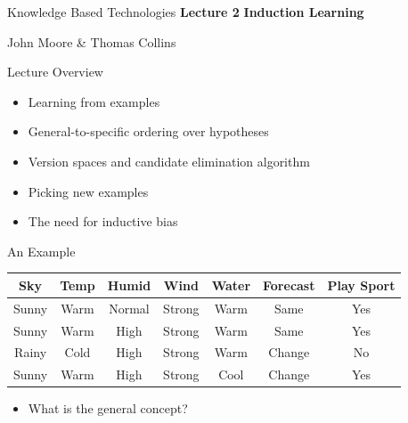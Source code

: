 \documentclass[%
pdf,
colorBG,
slideColor,
tcrico,
]{prosper}
\begin{document}
\begin{slide}{Knowledge Based Technologies}
\large
\textbf{Lecture 2} 
\newline
\textbf{Induction Learning}

\bigskip
\small
John Moore \& Thomas Collins



\end{slide}



\begin{slide}{Lecture Overview}
\begin{itemize}
\item Learning from examples
\item General-to-specific ordering over hypotheses
\item Version spaces and candidate elimination algorithm
\item Picking new examples
\item The need for inductive bias
\end{itemize}
\end{slide}



\begin{slide}{An Example}
	\begin{center}
	\tiny
	\begin{tabular}{ccccccc} \hline
	\rowcolor[HTML]{99aabb}\textbf{Sky} & \textbf{Temp} & \textbf{Humid} & \textbf{Wind} & \textbf{Water} & \textbf{Forecast}& \textbf{Play Sport}
	\\ \hline \hline
	\rowcolor[HTML]{bbccdd} Sunny   & Warm    & Normal & Strong  & Warm    & Same      & Yes \\
	\rowcolor[HTML]{ccddee}Sunny   & Warm    & High   & Strong  & Warm    & Same      & Yes \\
	\rowcolor[HTML]{bbccdd} Rainy    & Cold    & High   & Strong  & Warm    & Change     & No \\
	\rowcolor[HTML]{ccddee}Sunny    & Warm    & High   & Strong  & Cool    & Change    & Yes \\ 
	\end{tabular}
	\end{center}
\begin{itemize}
\item What is the general concept?
\end{itemize} 

\end{slide}
\end{document}
